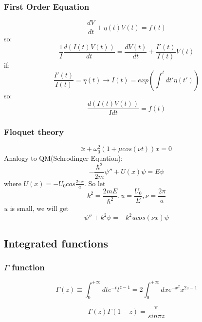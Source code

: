 \subsubsection{First Order Equation}
\[ 
\frac{dV}{dt} + \eta(t)V(t) = f(t)  
\]
so:
\[
    \frac{1}{I}\frac{d(I(t)V(t))}{dt} = \frac{dV(t)}{dt} + \frac{I'(t)}{I(t)}V(t)
    \]
if: 
\[ 
    \frac{I'(t)}{I(t)} = \eta(t)	\rightarrow I(t) = exp(\int^{t}dt'\eta(t'))
    \]
so:
\[ \frac{d(I(t)V(t))}{I dt} = f(t)\]

\subsubsection{Floquet theory}
\begin{equation}
    \ddot{x} + \omega_{0}^{2}(1+\mu cos(\nu t))x = 0
\end{equation}
Analogy to QM(Schrodinger Equation):	
\[
    -\frac{\hbar^{2}}{2m}{\psi''} + U(x)\psi = E\psi
    \]
where $U(x) = -U_{0}cos\frac{2\pi x}{a}$.
So let 
\[
    k^{2} = \frac{2mE}{\hbar^{2}}, u=\frac{U_0}{E}, \nu=\frac{2\pi}{a}
    \]
$u$ is small, we will get   
\[ 
    \psi''+k^{2}\psi = -k^{2}ucos(\nu x)\psi
    \]

\subsection{Integrated functions}
\subsubsection{$\Gamma$ function}
\[\Gamma(z) \equiv \int_{0}^{+\infty}dt e^{-t} t^{z-1} =
2\int_{0}^{+\infty}dx e^{-x^2}x^{2z-1}\]

\[\Gamma(z)\Gamma(1-z) = \frac{\pi}{sin\pi z}\]

